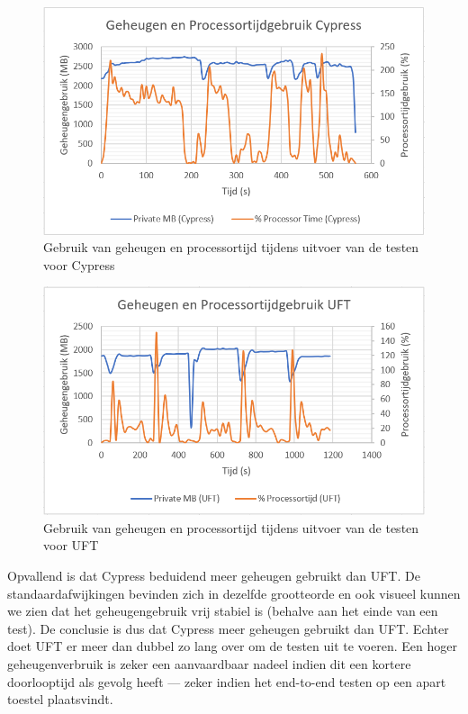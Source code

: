 \begin{figure}[h!]
    \centering
    \includegraphics[scale=0.6]{img/resultaten/processor-geheugengebruik-cypress.PNG}
    \caption{Gebruik van geheugen en processortijd tijdens uitvoer van de testen voor Cypress}
    \label{fig:resultaten-cypress}
\end{figure}

\begin{figure}[h!]
    \centering
    \includegraphics[scale=0.6]{img/resultaten/processor-geheugengebruik-uft.PNG}
    \caption{Gebruik van geheugen en processortijd tijdens uitvoer van de testen voor UFT}
    \label{fig:resultaten-uft}
\end{figure}

Opvallend is dat Cypress beduidend meer geheugen gebruikt dan UFT. De standaardafwijkingen bevinden zich in dezelfde grootteorde en ook visueel kunnen we zien dat het geheugengebruik vrij stabiel is (behalve aan het einde van een test). De conclusie is dus dat Cypress meer geheugen gebruikt dan UFT. Echter doet UFT er meer dan dubbel zo lang over om de testen uit te voeren. Een hoger geheugenverbruik is zeker een aanvaardbaar nadeel indien dit een kortere doorlooptijd als gevolg heeft — zeker indien het end-to-end testen op een apart toestel plaatsvindt.

